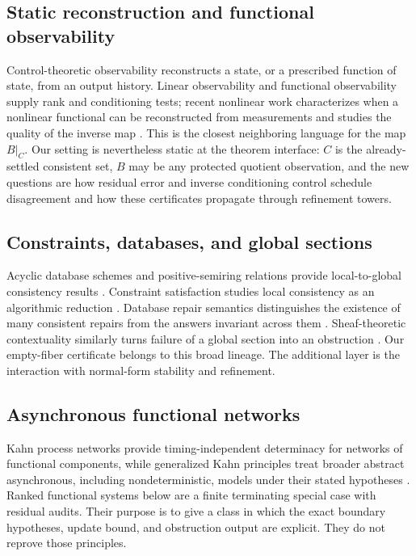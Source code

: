 \documentclass[11pt]{article}
\theoremstyle{definition}
\theoremstyle{remark}
\numberwithin{equation}{section}
\begin{document}
\subsection{Static reconstruction and functional observability}

Control-theoretic observability reconstructs a state, or a prescribed function of state, from an output history.  Linear observability and functional observability supply rank and conditioning tests; recent nonlinear work characterizes when a nonlinear functional can be reconstructed from measurements and studies the quality of the inverse map \citep{Kailath1980,MontanariEtAl2023,Kravaris2024}.  This is the closest neighboring language for the map $B|_C$.  Our setting is nevertheless static at the theorem interface: $C$ is the already-settled consistent set, $B$ may be any protected quotient observation, and the new questions are how residual error and inverse conditioning control schedule disagreement and how these certificates propagate through refinement towers.

\subsection{Constraints, databases, and global sections}

Acyclic database schemes and positive-semiring relations provide local-to-global consistency results \citep{BeeriEtAl1983,AtseriasKolaitis2020}.  Constraint satisfaction studies local consistency as an algorithmic reduction \citep{DalmauOprsal2023}.  Database repair semantics distinguishes the existence of many consistent repairs from the answers invariant across them \citep{ArenasBertossiChomicki1999}.  Sheaf-theoretic contextuality similarly turns failure of a global section into an obstruction \citep{AbramskyBrandenburger2011}.  Our empty-fiber certificate belongs to this broad lineage.  The additional layer is the interaction with normal-form stability and refinement.

\subsection{Asynchronous functional networks}

Kahn process networks provide timing-independent determinacy for networks of
functional components, while generalized Kahn principles treat broader
abstract asynchronous, including nondeterministic, models under their stated
hypotheses \citep{Kahn1974,Abramsky2011}.  Ranked functional systems below
are a finite terminating special case with residual audits.  Their purpose is
to give a class in which the exact boundary hypotheses, update bound, and
obstruction output are explicit.  They do not reprove those principles.
\end{document}
